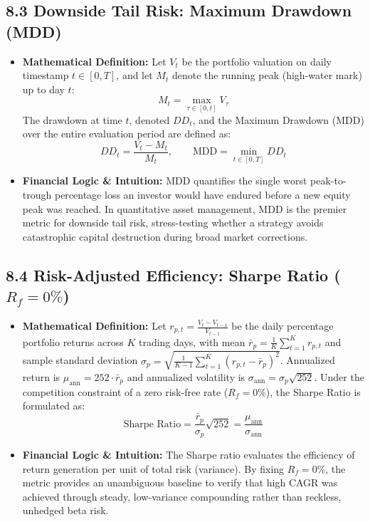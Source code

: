 \documentclass[11pt,a4paper]{article}
\begin{document}
\subsection{8.3 Downside Tail Risk: Maximum Drawdown (MDD)}
\begin{itemize}[leftmargin=1.5em]
    \item \textbf{Mathematical Definition:} Let $V_t$ be the portfolio valuation on daily timestamp $t \in [0, T]$, and let $M_t$ denote the running peak (high-water mark) up to day $t$:
    \begin{equation}
        M_t = \max_{\tau \in [0, t]} V_\tau
    \end{equation}
    The drawdown at time $t$, denoted $DD_t$, and the Maximum Drawdown ($\text{MDD}$) over the entire evaluation period are defined as:
    \begin{equation}
        DD_t = \frac{V_t - M_t}{M_t}, \qquad \text{MDD} = \min_{t \in [0, T]} DD_t
    \end{equation}
    \item \textbf{Financial Logic \& Intuition:} MDD quantifies the single worst peak-to-trough percentage loss an investor would have endured before a new equity peak was reached. In quantitative asset management, MDD is the premier metric for downside tail risk, stress-testing whether a strategy avoids catastrophic capital destruction during broad market corrections.
\end{itemize}

\subsection{8.4 Risk-Adjusted Efficiency: Sharpe Ratio ($R_f = 0\%$)}
\begin{itemize}[leftmargin=1.5em]
    \item \textbf{Mathematical Definition:} Let $r_{p, t} = \frac{V_t - V_{t-1}}{V_{t-1}}$ be the daily percentage portfolio returns across $K$ trading days, with mean $\bar{r}_p = \frac{1}{K}\sum_{t=1}^K r_{p, t}$ and sample standard deviation $\sigma_p = \sqrt{\frac{1}{K-1}\sum_{t=1}^K (r_{p, t} - \bar{r}_p)^2}$. Annualized return is $\mu_{\text{ann}} = 252 \cdot \bar{r}_p$ and annualized volatility is $\sigma_{\text{ann}} = \sigma_p \sqrt{252}$. Under the competition constraint of a zero risk-free rate ($R_f = 0\%$), the Sharpe Ratio is formulated as:
    \begin{equation}
        \text{Sharpe Ratio} = \frac{\bar{r}_p}{\sigma_p}\sqrt{252} = \frac{\mu_{\text{ann}}}{\sigma_{\text{ann}}}
    \end{equation}
    \item \textbf{Financial Logic \& Intuition:} The Sharpe ratio evaluates the efficiency of return generation per unit of total risk (variance). By fixing $R_f = 0\%$, the metric provides an unambiguous baseline to verify that high CAGR was achieved through steady, low-variance compounding rather than reckless, unhedged beta risk.
\end{itemize}
\end{document}
